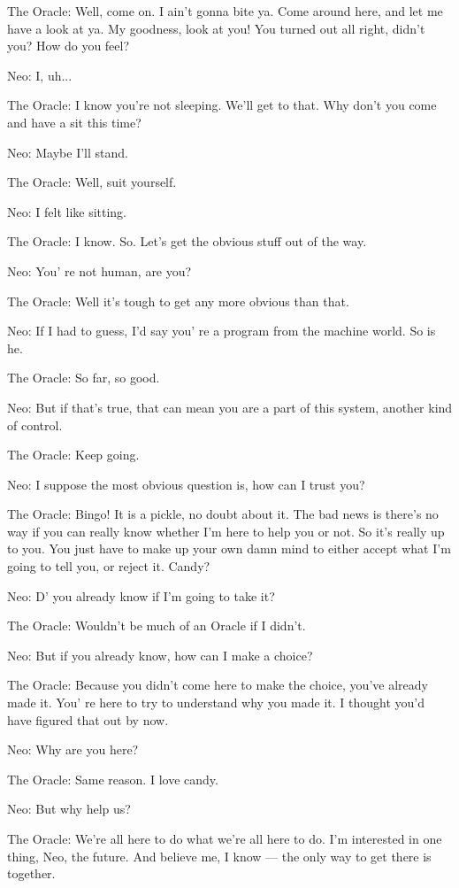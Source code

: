 \documentclass{ctexart}
\newenvironment{myquote}{\color{green} \setlength{\leftskip}{6em} \setlength{\rightskip}{4em} \setlength{\parindent}{-2em}}{\par}
\begin{document}
\begin{myquote}
The Oracle: Well, come on. I ain't gonna bite ya. Come around here, and let me have a look at ya. My goodness, look at you! You turned out all right, didn't you? How do you feel?

Neo: I, uh...

The Oracle: I know you're not sleeping. We'll get to that. Why don't you come and have a sit this time?

Neo: Maybe I'll stand.

The Oracle: Well, suit yourself.

Neo: I felt like sitting.

The Oracle: I know. So. Let's get the obvious stuff out of the way.

Neo: You' re not human, are you?

The Oracle: Well it's tough to get any more obvious than that.

Neo: If I had to guess, I'd say you' re a program from the machine world. So is he.

The Oracle: So far, so good.

Neo: But if that's true, that can mean you are a part of this system, another kind of control.

The Oracle: Keep going.

Neo: I suppose the most obvious question is, how can I trust you?

The Oracle: Bingo! It is a pickle, no doubt about it. The bad news is there's no way if you can really know whether I'm here to help you or not. So it's really up to you. You just have to make up your own damn mind to either accept what I'm going to tell you, or reject it. Candy?

Neo: D' you already know if I'm going to take it?

The Oracle: Wouldn't be much of an Oracle if I didn't.

Neo: But if you already know, how can I make a choice?

The Oracle: Because you didn't come here to make the choice, you've already made it. You' re here to try to understand why you made it. I thought you'd have figured that out by now.

Neo: Why are you here?

The Oracle: Same reason. I love candy.

Neo: But why help us?

The Oracle: We're all here to do what we're all here to do. I'm interested in one thing, Neo, the future. And believe me, I know --- the only way to get there is together.


\end{myquote}
\end{document}
